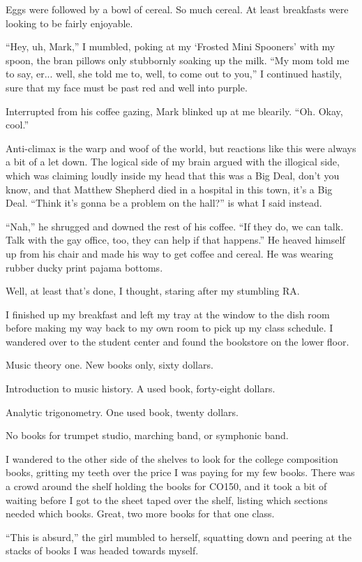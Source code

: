 Eggs were followed by a bowl of cereal.  So much cereal.  At least breakfasts were looking to be fairly enjoyable.

``Hey, uh, Mark,'' I mumbled, poking at my `Frosted Mini Spooners' with my spoon, the bran pillows only stubbornly soaking up the milk. ``My mom told me to say, er... well, she told me to, well, to come out to you,'' I continued hastily, sure that my face must be past red and well into purple.

Interrupted from his coffee gazing, Mark blinked up at me blearily.  ``Oh.  Okay, cool.''

Anti-climax is the warp and woof of the world, but reactions like this were always a bit of a let down.  The logical side of my brain argued with the illogical side, which was claiming loudly inside my head that this was a Big Deal, don't you know, and that Matthew Shepherd died in a hospital in this town, it's a Big Deal.  ``Think it's gonna be a problem on the hall?'' is what I said instead.

``Nah,''  he shrugged and downed the rest of his coffee.  ``If they do, we can talk.  Talk with the gay office, too, they can help if that happens.''  He heaved himself up from his chair and made his way to get coffee and cereal.  He was wearing rubber ducky print pajama bottoms.

Well, at least that's done, I thought, staring after my stumbling RA.

I finished up my breakfast and left my tray at the window to the dish room before making my way back to my own room to pick up my class schedule.  I wandered over to the student center and found the bookstore on the lower floor.

Music theory one.  New books only, sixty dollars.

Introduction to music history.  A used book, forty-eight dollars.

Analytic trigonometry.  One used book, twenty dollars.

No books for trumpet studio, marching band, or symphonic band.

I wandered to the other side of the shelves to look for the college composition books, gritting my teeth over the price I was paying for my few books.  There was a crowd around the shelf holding the books for CO150, and it took a bit of waiting before I got to the sheet taped over the shelf, listing which sections needed which books.  Great, two more books for that one class.

``This is absurd,'' the girl mumbled to herself, squatting down and peering at the stacks of books I was headed towards myself.

